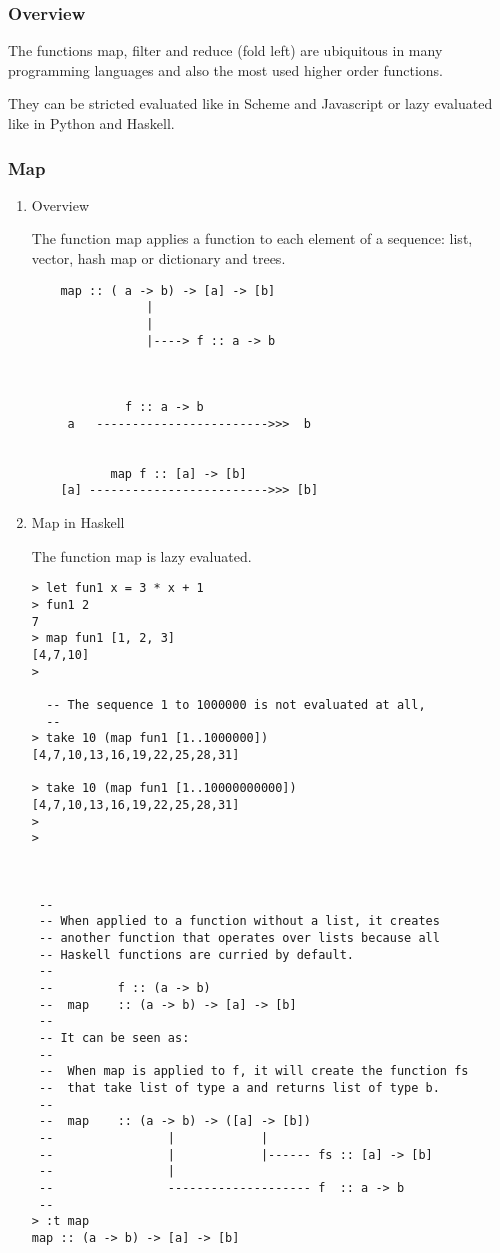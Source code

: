 \documentclass[11pt]{article}
\begin{document}
\subsubsection{Overview}
\label{sec-1-9-1}

The functions map, filter and reduce (fold left) are ubiquitous in
many programming languages and also the most used higher order
functions.

They can be stricted evaluated like in Scheme and Javascript or lazy
evaluated like in Python and Haskell.

\subsubsection{Map}
\label{sec-1-9-2}
\begin{enumerate}
\item Overview
\label{sec-1-9-2-0-1}

The function map applies a function to each element of a sequence:
list, vector, hash map or dictionary and trees. 

\begin{verbatim}
    map :: ( a -> b) -> [a] -> [b]                
                |
                |
                |----> f :: a -> b
                
    
    
             f :: a -> b
     a   ------------------------>>>  b
    
    
           map f :: [a] -> [b]                    
    [a] ------------------------->>> [b]
\end{verbatim}

\item Map in Haskell
\label{sec-1-9-2-0-2}

The function map is lazy evaluated.

\begin{verbatim}
> let fun1 x = 3 * x + 1
> fun1 2
7
> map fun1 [1, 2, 3]
[4,7,10]
> 

  -- The sequence 1 to 1000000 is not evaluated at all, 
  --
> take 10 (map fun1 [1..1000000])
[4,7,10,13,16,19,22,25,28,31]

> take 10 (map fun1 [1..10000000000])
[4,7,10,13,16,19,22,25,28,31]
> 
> 



 -- 
 -- When applied to a function without a list, it creates 
 -- another function that operates over lists because all
 -- Haskell functions are curried by default.
 --
 --         f :: (a -> b)
 --  map    :: (a -> b) -> [a] -> [b]
 --
 -- It can be seen as:
 --
 --  When map is applied to f, it will create the function fs
 --  that take list of type a and returns list of type b.
 --
 --  map    :: (a -> b) -> ([a] -> [b])
 --                |            |
 --                |            |------ fs :: [a] -> [b] 
 --                |    
 --                -------------------- f  :: a -> b 
 --
> :t map
map :: (a -> b) -> [a] -> [b]
  

\end{verbatim}
\end{enumerate}
\end{document}
